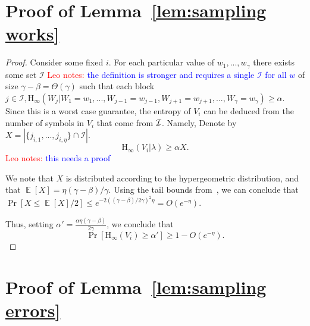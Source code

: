 \documentclass[11pt]{article}
\newcommand{\lemref}[1]{\mbox{Lemma~\ref{#1}}}
\DeclareMathOperator*{\expe}{\mathbb{E}}
\newcommand{\Hoo}{\mathrm{H}_\infty}
\newcommand{\authnote}[2]{{\textcolor{red}{\textsf{#1 notes: }\textcolor{blue}{ #2}}\marginpar{\textcolor{red}{\textbf{!!!!!}}}}}
\newcommand{\authnote}[2]{}
\newcommand{\lnote}[1]{{\authnote{Leo}{#1}}}
\begin{document}
\section{Proof of \lemref{lem:sampling works}}
\label{sec:proof of sampling lemma}
\begin{proof}
Consider some fixed $i$.
For each particular value of $w_1,..., w_\gamma$ there exists some set $\mathcal{I}$ \lnote{the definition is stronger and requires a single $\mathcal{I}$ for all $w$} of size $\gamma - \beta = \Theta(\gamma)$ such that each block $j\in \mathcal{I}, \Hoo(W_j | W_1 = w_1,..., W_{j-1}=w_{j-1}, W_{j+1}=w_{j+1},..., W_\gamma = w_\gamma) \geq \alpha$.  Since this is a worst case guarantee, the entropy of $V_i$ can be deduced from the number of symbols in $V_i$ that come from $\cal{I}$. Namely, Denote by $X= |\{j_{i, 1},..., j_{i, \eta}\}\cap \mathcal{I}|$.
\[
\Hoo(V_i |\lambda ) \geq \alpha X.
\]
\lnote{this needs a proof}

We note that $X$ is distributed according to the hypergeometric distribution,
and that $\expe[X]=\eta(\gamma-\beta)/\gamma$. Using the tail bounds from~\cite{chvatal1979tail,skala2009hypergeometric}, we can conclude that $\Pr[X\le \expe[X]/2]\le e^{-2((\gamma-\beta)/2\gamma)^2 \eta}=O(e^{-\eta})$.

Thus, setting $\alpha'=\frac{\alpha \eta(\gamma-\beta)}{2\gamma}$, we conclude that 
 \[
\Pr[\Hoo(V_i ) \geq \alpha'] \geq 1- O(e^{-\eta}).
\]
\end{proof}

\section{Proof of \lemref{lem:sampling errors}}
\label{sec:sampling errors}
\end{document}
